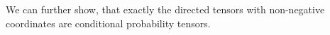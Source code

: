 









We can further show, that exactly the directed tensors with non-negative coordinates are conditional probability tensors.

